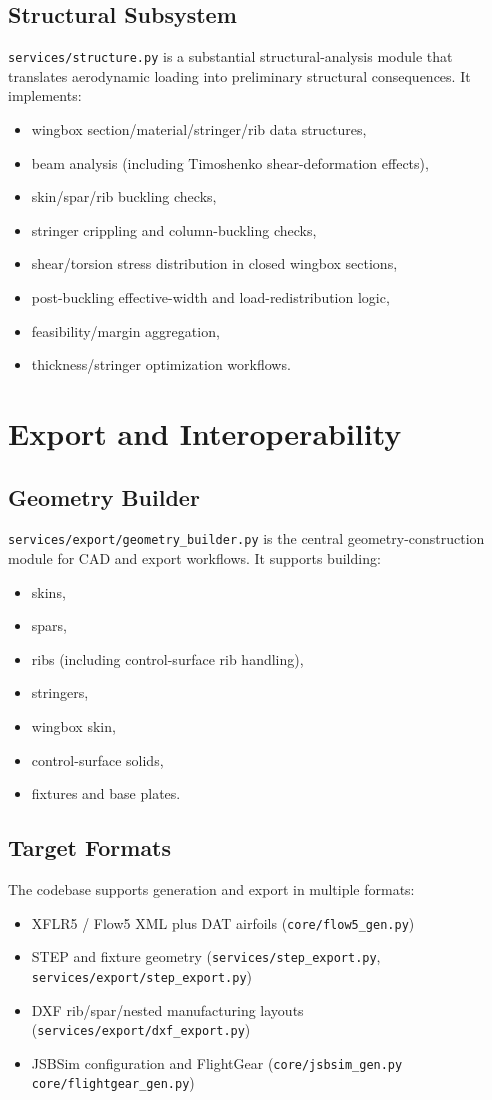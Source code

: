 \subsection{Structural Subsystem}
\texttt{services/structure.py} is a substantial structural-analysis module that translates aerodynamic loading into preliminary structural consequences. It implements:
\begin{itemize}
\item wingbox section/material/stringer/rib data structures,
\item beam analysis (including Timoshenko shear-deformation effects),
\item skin/spar/rib buckling checks,
\item stringer crippling and column-buckling checks,
\item shear/torsion stress distribution in closed wingbox sections,
\item post-buckling effective-width and load-redistribution logic,
\item feasibility/margin aggregation,
\item thickness/stringer optimization workflows.
\end{itemize}

\section{Export and Interoperability}
\subsection{Geometry Builder}
\texttt{services/export/geometry\_builder.py} is the central geometry-construction module for CAD and export workflows. It supports building:
\begin{itemize}
\item skins,
\item spars,
\item ribs (including control-surface rib handling),
\item stringers,
\item wingbox skin,
\item control-surface solids,
\item fixtures and base plates.
\end{itemize}

\subsection{Target Formats}
The codebase supports generation and export in multiple formats:
\begin{itemize}
\item XFLR5 / Flow5 XML plus DAT airfoils (\texttt{core/flow5\_gen.py})
\item STEP and fixture geometry (\texttt{services/step\_export.py}, \texttt{services/export/step\_export.py})
\item DXF rib/spar/nested manufacturing layouts (\texttt{services/export/dxf\_export.py})
\item JSBSim configuration and FlightGear (\texttt{core/jsbsim\_gen.py} \texttt{core/flightgear\_gen.py})

\end{itemize}

